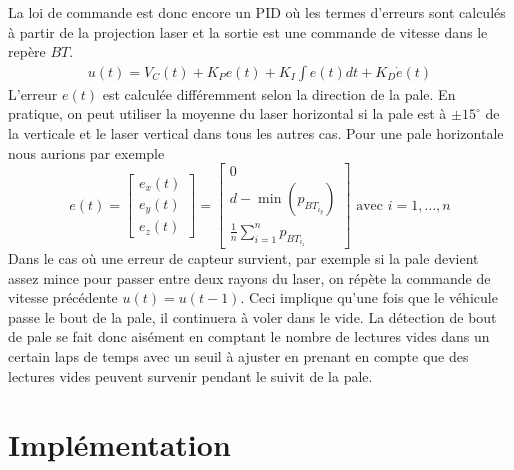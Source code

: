 La loi de commande est donc encore un PID où les termes d'erreurs sont calculés à partir de la projection laser et la sortie est une commande de vitesse dans le repère ${BT}$.
\begin{align}
  u(t) = V_C(t) + K_P e(t) + K_I\int{e(t)dt} + K_D\dot{e}(t)
  \label{eq:pid_laser_blade}
\end{align}
L'erreur $e(t)$ est calculée différemment selon la direction de la pale. En pratique, on peut utiliser la moyenne du laser horizontal si la pale est à $\pm15^{\circ}$ de la verticale et le laser vertical dans tous les autres cas. Pour une pale horizontale nous aurions par exemple
\[
e(t) = \begin{bmatrix}e_x(t) \\ e_y(t) \\ e_z(t)\end{bmatrix} =
\begin{bmatrix}
0 \\ d - \min(p_{{BT}_{i_y}}) \\ \frac{1}{n}\sum_{i=1}^{n}p_{{BT}_{i_z}}
\end{bmatrix} \text{ avec } i=1,\ldots,n
\]
Dans le cas où une erreur de capteur survient, par exemple si la pale devient assez mince pour passer entre deux rayons du laser, on répète la commande de vitesse précédente $u(t) = u(t-1)$. Ceci implique qu'une fois que le véhicule passe le bout de la pale, il continuera à voler dans le vide. La détection de bout de pale se fait donc aisément en comptant le nombre de lectures vides dans un certain laps de temps avec un seuil à ajuster en prenant en compte que des lectures vides peuvent survenir pendant le suivit de la pale.

%

\clearpage
\section{Implémentation}

